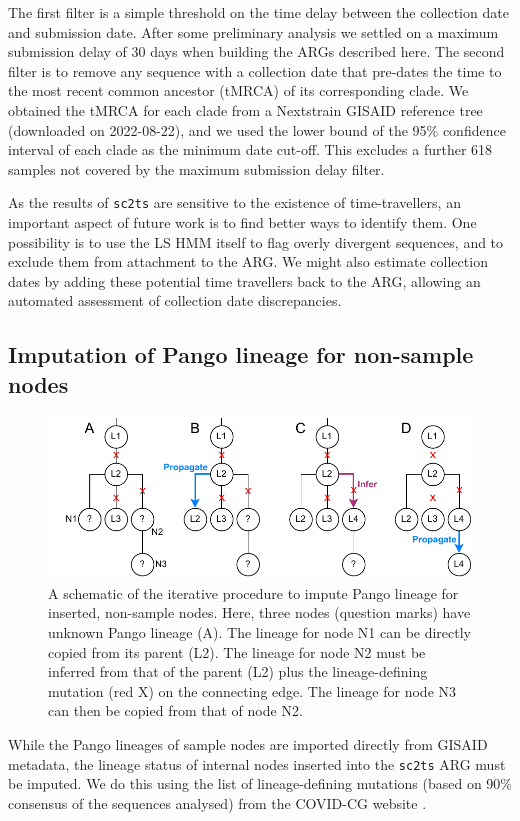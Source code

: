 \documentclass{article}
\begin{document}
The first filter is a simple threshold on
the time delay between the collection date and submission date.
After some preliminary analysis we settled on a maximum submission delay
of 30 days when building the ARGs described here.
The second filter is to remove any sequence with a collection date that
pre-dates the
time to the most recent common ancestor (tMRCA) of its corresponding clade.
We obtained the tMRCA for each clade from a Nextstrain GISAID reference tree
(downloaded on 2022-08-22), and we used the lower bound of the 95\%
confidence interval of each clade as the minimum date cut-off.
This excludes a further 618 samples not covered by the maximum submission
delay filter.

As the results of \texttt{sc2ts} are sensitive to the existence of
time-travellers, an important aspect of future work is to find better ways
to identify them. One possibility is to use the LS HMM itself to flag
overly divergent sequences, and to exclude them from attachment to the ARG.
We might also estimate collection dates by adding these potential time travellers
back to the ARG, allowing an automated assessment of collection date discrepancies.

\subsection{Imputation of Pango lineage for non-sample nodes}

\begin{figure} \centering
\includegraphics[width=.7\textwidth]{figures/imputation.pdf}
\caption{\label{fig:imputation}A schematic of the iterative procedure to impute
Pango lineage for inserted, non-sample nodes. Here, three nodes (question
marks) have unknown Pango lineage (A). The lineage for node N1 can be directly
copied from its parent (L2). The lineage for node N2 must be inferred from
that of the parent (L2) plus the lineage-defining mutation (red X)
on the connecting edge. The lineage for node N3 can then be copied from
that of node N2.}
\end{figure}
While the Pango lineages of sample nodes are imported directly from
GISAID metadata, the lineage status of internal nodes inserted into
the \texttt{sc2ts} ARG must be imputed. We do this using
the list of lineage-defining mutations (based on 90\% consensus
of the sequences analysed) from the
COVID-CG website \citep[][\url{https://covidcg.org/};
accessed on 2022-11-04]{Chen2021-zc}.
\end{document}
